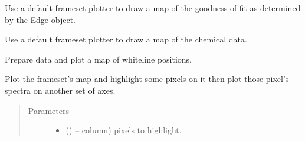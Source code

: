 \documentclass[letterpaper,10pt,english]{sphinxmanual}
\begin{document}
\begin{fulllineitems}
\begin{fulllineitems}
\end{fulllineitems}


\begin{fulllineitems}
\label{\detokenize{xanespy:xanespy.xanes_frameset.XanesFrameset.plot_goodness}}
Use a default frameset plotter to draw a map of the goodness of fit
as determined by the Edge object.

\end{fulllineitems}


\begin{fulllineitems}
\label{\detokenize{xanespy:xanespy.xanes_frameset.XanesFrameset.plot_histogram}}
Use a default frameset plotter to draw a map of the chemical
data.

\end{fulllineitems}


\begin{fulllineitems}
\label{\detokenize{xanespy:xanespy.xanes_frameset.XanesFrameset.plot_map}}
Prepare data and plot a map of whiteline positions.

\end{fulllineitems}


\begin{fulllineitems}
\label{\detokenize{xanespy:xanespy.xanes_frameset.XanesFrameset.plot_map_pixel_spectra}}
Plot the frameset's map and highlight some pixels on it then plot
those pixel's spectra on another set of axes.
\begin{quote}\begin{description}
\item[{Parameters}] \leavevmode\begin{itemize}
\item {} 
 (\sphinxstyleliteralemphasis{-}) -- column) pixels to highlight.


\end{itemize}
\end{description}
\end{quote}
\end{fulllineitems}
\end{fulllineitems}
\end{document}
